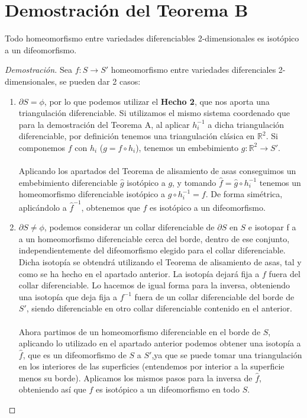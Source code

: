 \section{Demostración del Teorema B}
	\begin{teorb}
		Todo homeomorfismo entre variedades diferenciables 2-dimensionales es isotópico a un difeomorfismo.
	\end{teorb}
	\begin{proof}[Demostración]
		Sea $f: S \rightarrow S'$ homeomorfismo entre variedades diferenciales 2-dimensionales, se pueden dar 2 casos:
		\begin{enumerate}
			\item $\partial S = \phi$, por lo que podemos utilizar el \textbf{Hecho 2}, que nos aporta una triangulación diferenciable. Si utilizamos el mismo sistema coordenado que para la demostración del Teorema A, al aplicar $h_i^{-1}$ a dicha triangulación diferenciable, por definición tenemos una triangulación clásica en $\mathbb{R}^2$. Si componemos $f$ con $h_i$ ($g=f\circ h_i$), tenemos un embebimiento $g: \mathbb{R}^2 \rightarrow S'$.\\
			\\ Aplicando los apartados del Teorema de alisamiento de asas conseguimos un embebimiento diferenciable $\widehat{g}$ isotópico a $g$, y tomando $\widehat{f}=\widehat{g}\circ h_i^{-1}$ tenemos un homeomorfismo diferenciable isotópico a $g\circ h_i^{-1}=f$. De forma simétrica, aplicándolo a $\widehat{f}^{-1}$, obtenemos que $f$ es isotópico a un difeomorfismo. 
			\item $\partial S \neq \phi$, podemos considerar un collar diferenciable de $\partial S$ en $S$ e isotopar f a a un homeomorfismo diferenciable cerca del borde, dentro de ese conjunto, independientemente del difeomorfismo elegido para el collar diferenciable. Dicha isotopía se obtendrá utilizando el Teorema de alisamiento de asas, tal y como se ha hecho en el apartado anterior. La isotopía dejará fija a $f$ fuera del collar diferenciable. Lo hacemos de igual forma para la inversa, obteniendo una isotopía que deja fija a $f^{-1}$ fuera de un collar diferenciable del borde de $S'$, siendo diferenciable en otro collar diferenciable contenido en el anterior.\\
			\\ Ahora partimos de un homeomorfismo diferenciable en el borde de $S$, aplicando lo utilizado en el apartado anterior podemos obtener una isotopía a $\widehat{f}$, que es un difeomorfismo de $S$ a $S'$,ya que se puede tomar una triangulación en los interiores de las superficies (entendemos por interior a la superficie menos su borde). Aplicamos los mismos pasos para la inversa de $\widehat{f}$, obteniendo así que $f$ es isotópico a un difeomorfismo en todo $S$.
		\end{enumerate}
	\end{proof}
\endinput
